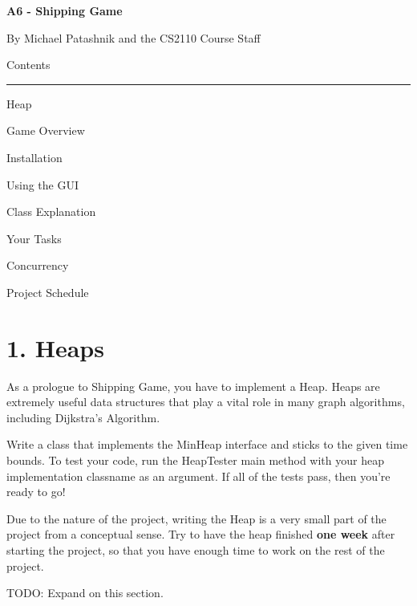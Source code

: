 \documentclass[11pt]{article}
\begin{document}
\lstset{language=Java}
\begin{center}
\begin{HUGE}{\bf A6 - Shipping Game}\\ \end{HUGE}
\vspace{3mm}
\begin{LARGE} By Michael Patashnik and the CS2110 Course Staff\\ \end{LARGE}
\vspace{7mm}
\begin{LARGE} Contents\\ \end{LARGE}
\noindent\rule{8cm}{0.4pt}
\begin{enumerate} \begin{large}
\item Heap
\item Game Overview
\item Installation
\item Using the GUI
\item Class Explanation
\item Your Tasks
\item Concurrency
\item Project Schedule
\end{large}\end{enumerate}
\end{center}
\newpage

\section{1. Heaps}
As a prologue to Shipping Game, you have to implement a Heap. Heaps are extremely useful data structures that play a vital role in many graph algorithms, including Dijkstra's Algorithm.

Write a class that implements the MinHeap interface and sticks to the given time bounds. To test your code, run the HeapTester main method with your heap implementation classname as an argument. If all of the tests pass, then you're ready to go!

Due to the nature of the project, writing the Heap is a very small part of the project from a conceptual sense. Try to have the heap finished \textbf{one week} after starting the project, so that you have enough time to work on the rest of the project.

TODO: Expand on this section.
\end{document}
